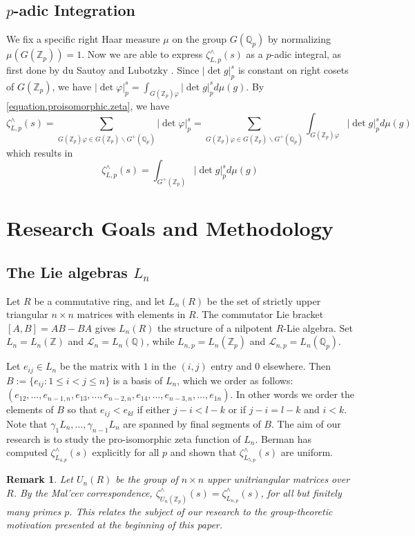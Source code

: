 \documentclass[12pt]{article}
\newtheorem{remark}[theorem]{Remark}
\begin{document}
\subsection{$p$-adic Integration}
We fix a specific right Haar measure $\mu$ on the group $G(\mathbb{Q}_{p})$ by normalizing $\mu(G(\mathbb{Z}_p))=1$. Now we are able to express $\zeta_{L,p}^{\wedge}(s)$ as a $p$-adic integral, as first done by du Sautoy and Lubotzky \cite{DuSautoyLubotzky}. Since $|\det{g}|_{p}^{s}$ is constant on right cosets of $G(\mathbb{Z}_{p})$, we have $|\det\varphi|_{p}^{s}=\displaystyle\int_{G(\mathbb{Z}_p)\varphi}{|\det{g}|_{p}^{s}}d\mu(g)$. By \eqref{equation.proisomorphic.zeta}, we have \[\zeta_{L,p}^{\wedge}(s)=\underset{\scriptscriptstyle G(\mathbb{Z}_p)\varphi\in G(\mathbb{Z}_p)\backslash{G^{+}(\mathbb{Q}_p)}}{\sum}|\det\varphi|_{p}^{s}=\underset{\scriptscriptstyle{G(\mathbb{Z}_p)}\varphi\in G(\mathbb{Z}_p)\backslash{G^{+}(\mathbb{Q}_p)}}{\sum}\displaystyle{\int_{G(\mathbb{Z}_p)\varphi}}{|\det{g}|_{p}^{s}}d\mu(g)\]
which results in \begin{equation}
\label{eq:p-adic.integral}
\zeta_{L,p}^{\wedge}(s)=\displaystyle\int_{G^{+}(\mathbb{Z}_p)}{|\det{g}|_{p}^{s}}d\mu(g)
\end{equation}
\section{Research Goals and Methodology}
\subsection{The Lie algebras $L_{n}$}
Let $R$ be a commutative ring, and let $L_{n}(R)$ be the set of strictly upper triangular $n\times{n}$ matrices with elements in $R$. The commutator Lie bracket $[A,B]=AB-BA$ gives $L_{n}(R)$ the structure of a nilpotent $R$-Lie algebra. Set $L_{n}=L_{n}(\mathbb{Z})$ and $\mathcal{L}_{n}=L_{n}(\mathbb{Q})$, while $L_{n,p}=L_{n}(\mathbb{Z}_{p})$ and $\mathcal{L}_{n,p}=L_{n}(\mathbb{Q}_{p})$.

Let $e_{ij}\in{L_{n}}$ be the matrix with $1$ in the $(i,j)$ entry and $0$ elsewhere. Then $B:=\{e_{ij} : 1\leq{i}<{j}\leq{n}\}$ is a basis of $L_{n}$, which we order as follows: $(e_{12},\dots,e_{n-1,n},e_{13},\dots,e_{n-2,n},e_{14},\dots,e_{n-3,n},\dots,e_{1n})$. In other words we order the elements of $B$ so that $e_{ij}<e_{kl}$ if either $j-i<l-k$ or if $j-i=l-k$ and $i<k$. Note that $\gamma_{1}L_{n},\dots,\gamma_{n-1}L_{n}$ are spanned by final segments of $B$. The aim of our research is to study the pro-isomorphic zeta function of $L_{n}$. Berman has computed $\zeta_{L_{4,p}}^{\wedge}(s)$ explicitly for all $p$ and shown that $\zeta_{L_{5,p}}^{\wedge}(s)$ are uniform.
\begin{remark}
Let $U_n(R)$ be the group of $n\times{n}$ upper unitriangular matrices over $R$. By the Mal'cev correspondence, ${\zeta^\wedge_{U_{n}(\mathbb{Z}_{p})}}(s)={\zeta^\wedge_{L_{n,p}}}(s)$, for all but finitely many primes $p$. This relates the subject of our research to the group-theoretic motivation presented at the beginning of this paper.
\end{remark}
\end{document}
